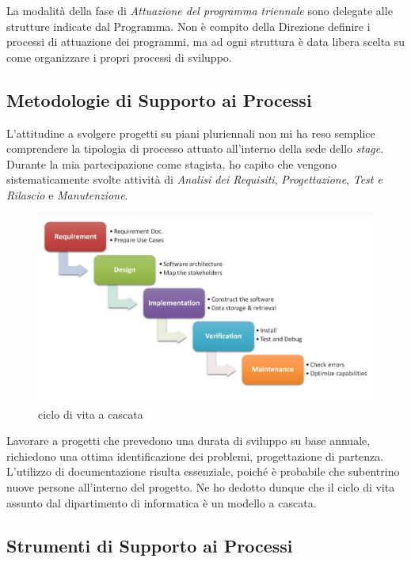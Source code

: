 La modalità della fase di \textit{Attuazione del programma triennale} sono delegate alle strutture indicate dal Programma. Non è compito della Direzione definire i processi di attuazione dei programmi, ma ad ogni struttura è data libera scelta su come organizzare i propri processi di sviluppo. \\

\subsection{Metodologie di Supporto ai Processi}


L'attitudine a svolgere progetti su piani pluriennali non mi ha reso semplice comprendere la tipologia di processo attuato all'interno della sede dello \textit{stage}. Durante la mia partecipazione come stagista, ho capito che vengono sistematicamente svolte attività di \textit{Analisi dei Requisiti}, \textit{Progettazione}, \textit{Test e Rilascio} e \textit{Manutenzione}. 
\begin{figure}[htbp]

	\includegraphics[scale=0.3]{./capitoli/capitolo1/img/cascata}
	\caption{ciclo di vita a cascata}

\end{figure}

Lavorare a progetti che prevedono una durata di sviluppo su base annuale, richiedono una ottima identificazione dei problemi, progettazione di partenza. L'utilizzo di documentazione risulta essenziale, poiché è probabile che subentrino nuove persone all'interno del progetto.
Ne ho dedotto dunque che il ciclo di vita assunto dal dipartimento di informatica è un modello a cascata.


\subsection{Strumenti di Supporto ai Processi}

